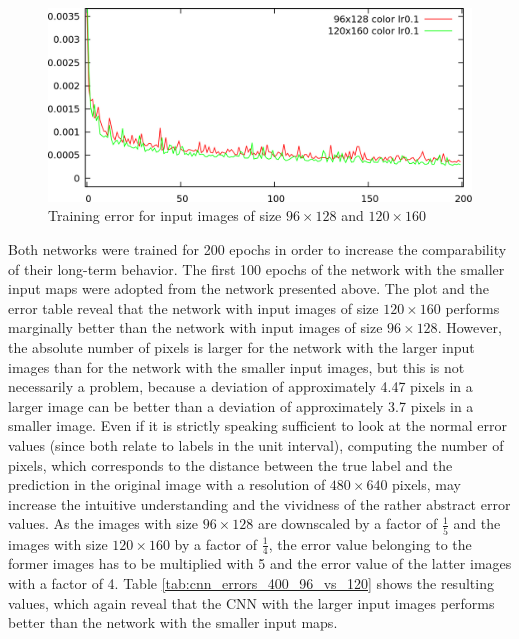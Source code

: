 \documentclass[11pt, a4paper]{article}
\begin{document}
\begin{figure}[h!]
	\centering
	\includegraphics[width=\textwidth]{results/cnn_96vs120.png}
	\caption{Training error for input images of size $96\times128$ and $120\times160$}
	\label{fig:cnn_96_vs_120}
\end{figure}



Both networks were trained for 200 epochs in order to increase the comparability of their long-term behavior. The first 100 epochs of the network with the smaller input maps were adopted from the network presented above. The plot and the error table reveal that the network with input images of size $120\times160$ performs marginally better than the network with input images of size $96\times128$. However, the absolute number of pixels is larger for the network with the larger input images than for the network with the smaller input images, but this is not necessarily a problem, because a deviation of approximately 4.47 pixels in a larger image can be better than a deviation of approximately 3.7 pixels in a smaller image. Even if it is strictly speaking sufficient to look at the normal error values (since both relate to labels in the unit interval), computing the number of pixels, which corresponds to the distance between the true label and the prediction in the original image with a resolution of $480\times640$ pixels, may increase the intuitive understanding and the vividness of the rather abstract error values. As the images with size $96\times128$ are downscaled by a factor of $\frac{1}{5}$ and the images with size $120\times160$ by a factor of $\frac{1}{4}$, the error value belonging to the former images has to be multiplied with 5 and the error value of the latter images with a factor of 4. Table \ref{tab:cnn_errors_400_96_vs_120} shows the resulting values, which again reveal that the \ac{CNN} with the larger input images performs better than the network with the smaller input maps.
\end{document}
